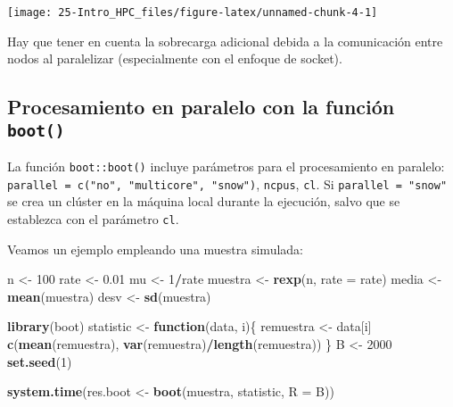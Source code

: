 \documentclass[]{book}
\newenvironment{Shaded}{\begin{snugshade}}{\end{snugshade}}
\newcommand{\KeywordTok}[1]{\textcolor[rgb]{0.13,0.29,0.53}{\textbf{#1}}}
\newcommand{\DataTypeTok}[1]{\textcolor[rgb]{0.13,0.29,0.53}{#1}}
\newcommand{\DecValTok}[1]{\textcolor[rgb]{0.00,0.00,0.81}{#1}}
\newcommand{\FloatTok}[1]{\textcolor[rgb]{0.00,0.00,0.81}{#1}}
\newcommand{\StringTok}[1]{\textcolor[rgb]{0.31,0.60,0.02}{#1}}
\newcommand{\ControlFlowTok}[1]{\textcolor[rgb]{0.13,0.29,0.53}{\textbf{#1}}}
\newcommand{\OperatorTok}[1]{\textcolor[rgb]{0.81,0.36,0.00}{\textbf{#1}}}
\newcommand{\NormalTok}[1]{#1}
\theoremstyle{break}
\theoremstyle{definition}
\theoremstyle{definition}
\theoremstyle{definition}
\theoremstyle{remark}
\begin{document}
\begin{center}\texttt{[image: 25-Intro\_HPC\_files/figure-latex/unnamed-chunk-4-1]} \end{center}

Hay que tener en cuenta la sobrecarga adicional debida a la comunicación
entre nodos al paralelizar (especialmente con el enfoque de socket).

\subsection{\texorpdfstring{Procesamiento en paralelo con la función
\texttt{boot()}}{Procesamiento en paralelo con la función boot()}}\label{procesamiento-en-paralelo-con-la-funciuxf3n-boot}

La función \texttt{boot::boot()} incluye parámetros para el
procesamiento en paralelo:
\texttt{parallel\ =\ c("no",\ "multicore",\ "snow")}, \texttt{ncpus},
\texttt{cl}. Si \texttt{parallel\ =\ "snow"} se crea un clúster en la
máquina local durante la ejecución, salvo que se establezca con el
parámetro \texttt{cl}.

Veamos un ejemplo empleando una muestra simulada:

\begin{Shaded}
\begin{Highlighting}[]
\NormalTok{n <-}\StringTok{ }\DecValTok{100}
\NormalTok{rate <-}\StringTok{ }\FloatTok{0.01}
\NormalTok{mu <-}\StringTok{ }\DecValTok{1}\OperatorTok{/}\NormalTok{rate}
\NormalTok{muestra <-}\StringTok{ }\KeywordTok{rexp}\NormalTok{(n, }\DataTypeTok{rate =}\NormalTok{ rate)}
\NormalTok{media <-}\StringTok{ }\KeywordTok{mean}\NormalTok{(muestra)}
\NormalTok{desv <-}\StringTok{ }\KeywordTok{sd}\NormalTok{(muestra)}

\KeywordTok{library}\NormalTok{(boot)}
\NormalTok{statistic <-}\StringTok{ }\ControlFlowTok{function}\NormalTok{(data, i)\{}
\NormalTok{  remuestra <-}\StringTok{ }\NormalTok{data[i]}
  \KeywordTok{c}\NormalTok{(}\KeywordTok{mean}\NormalTok{(remuestra), }\KeywordTok{var}\NormalTok{(remuestra)}\OperatorTok{/}\KeywordTok{length}\NormalTok{(remuestra))}
\NormalTok{\}}
\NormalTok{B <-}\StringTok{ }\DecValTok{2000}
\KeywordTok{set.seed}\NormalTok{(}\DecValTok{1}\NormalTok{)}

\KeywordTok{system.time}\NormalTok{(res.boot <-}\StringTok{ }\KeywordTok{boot}\NormalTok{(muestra, statistic, }\DataTypeTok{R =}\NormalTok{ B))}
\end{Highlighting}
\end{Shaded}
\end{document}
